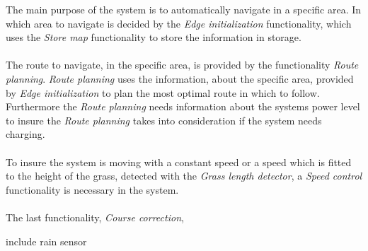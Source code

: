 \noindent
The main purpose of the system is to automatically navigate in a specific area. In which area to navigate is decided by the \textit{Edge initialization} functionality, which uses the \textit{Store map} functionality to store the information in storage.\\\\
The route to navigate, in the specific area, is provided by the functionality \textit{Route planning}. \textit{Route planning} uses the information, about the specific area, provided by \textit{Edge initialization} to plan the most optimal route in which to follow. Furthermore the \textit{Route planning} needs information about the systems power level to insure the \textit{Route planning} takes into consideration if the system needs charging.\\\\
To insure the system is moving with a constant speed or a speed which is fitted to the height of the grass, detected with the \textit{Grass length detector}, a \textit{Speed control} functionality is necessary in the system.\\\\
The last functionality, \textit{Course correction},  

include rain sensor

 


 
 